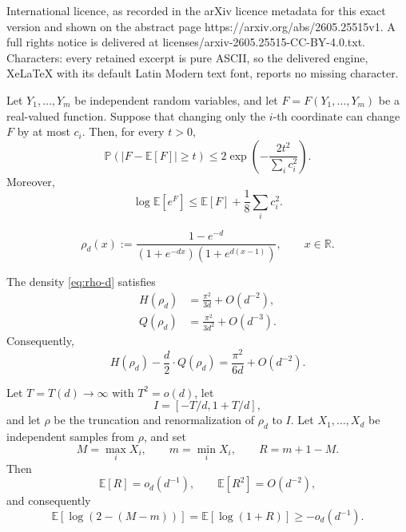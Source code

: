 \documentclass[10pt,a4paper]{amsart}
\newcommand{\EE}{\mathbb{E}}
\newcommand{\PP}{\mathbb{P}}
\newcommand{\RR}{\mathbb{R}}
\begin{document}
International licence, as recorded in the arXiv licence metadata for this exact version and shown on the abstract page https://arxiv.org/abs/2605.25515v1. A full rights notice is delivered at licenses/arxiv-2605.25515-CC-BY-4.0.txt. Characters: every retained excerpt is pure ASCII, so the delivered engine, XeLaTeX with its default Latin Modern text font, reports no missing character.
\begin{lemma}\label{lem:bounded-differences}
Let $Y_1,\ldots,Y_m$ be independent random variables, and let $F=F(Y_1,\ldots,Y_m)$ be a real-valued function.  Suppose that changing only the $i$-th coordinate can change $F$ by at most $c_i$.  Then, for every $t>0$,
\[
  \PP(|F-\EE \left[F\right]|\ge t)\le 2\exp\left(-\frac{2t^2}{\sum_i c_i^2}\right).
\]
Moreover,
\[
  \log \EE \left[e^F\right]\le \EE \left[F\right]+\frac18\sum_i c_i^2.
\]
\end{lemma}

\begin{equation}\label{eq:rho-d}
  \rho_d(x):=\frac{1-e^{-d}}{(1+e^{-dx})(1+e^{d(x-1)})},
  \qquad x\in\RR.
\end{equation}

\begin{lemma}\label{lem:logistic}
The density \eqref{eq:rho-d} satisfies
\begin{align}
  H(\rho_d)&=\frac{\pi^2}{3d}+O(d^{-2}),\label{eq:entropy-rho}\\
  Q(\rho_d)&=\frac{\pi^2}{3d^2}+O(d^{-3}).\label{eq:bad-rho}
\end{align}
Consequently,
\begin{equation}\label{eq:profile-gain}
  H(\rho_d)-\frac d2 \cdot Q(\rho_d)=\frac{\pi^2}{6d}+O(d^{-2}).
\end{equation}
\end{lemma}

\begin{lemma}\label{lem:neighbor-extremes}
Let $T=T(d)\to\infty$ with $T^2=o(d)$, let
\[
  I=[-T/d,1+T/d],
\]
and let $\rho$ be the truncation and renormalization of $\rho_d$ to $I$.  Let $X_1,\ldots,X_d$ be independent samples from $\rho$, and set
\[
  M=\max_i X_i,
  \qquad
  m=\min_i X_i,
  \qquad
  R=m+1-M.
\]
Then
\[
  \EE \left[R\right]=o_d(d^{-1}),
  \qquad
  \EE \left[R^2\right]=O(d^{-2}),
\]
and consequently
\[
  \EE\left[\log(2-(M-m))\right]=\EE\left[\log(1+R)\right]\ge -o_d(d^{-1}).
\]
\end{lemma}
\end{document}
